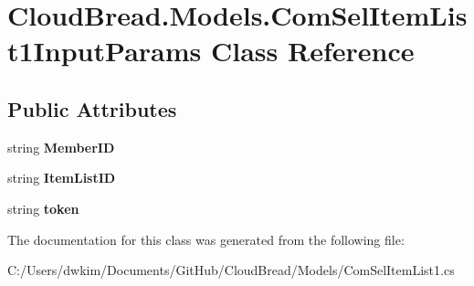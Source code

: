 \hypertarget{a00056}{}\section{Cloud\+Bread.\+Models.\+Com\+Sel\+Item\+List1\+Input\+Params Class Reference}
\label{a00056}
\subsection*{Public Attributes}
\begin{DoxyCompactItemize}
\item 
string {\bfseries Member\+ID}\hypertarget{a00056_a56ea09ae3fed36e05cb415874169d7b3}{}\label{a00056_a56ea09ae3fed36e05cb415874169d7b3}

\item 
string {\bfseries Item\+List\+ID}\hypertarget{a00056_aa06d87b5fbd1a9fab11288cb0d55d36a}{}\label{a00056_aa06d87b5fbd1a9fab11288cb0d55d36a}

\item 
string {\bfseries token}\hypertarget{a00056_a9e7daa23318bd51e9ed2d7e992d26c4d}{}\label{a00056_a9e7daa23318bd51e9ed2d7e992d26c4d}

\end{DoxyCompactItemize}


The documentation for this class was generated from the following file\+:\begin{DoxyCompactItemize}
\item 
C\+:/\+Users/dwkim/\+Documents/\+Git\+Hub/\+Cloud\+Bread/\+Models/Com\+Sel\+Item\+List1.\+cs\end{DoxyCompactItemize}
